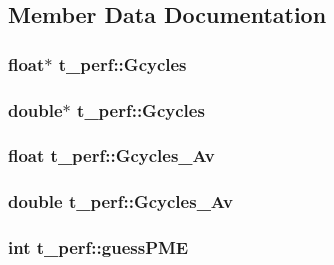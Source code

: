 \subsection{\-Member \-Data \-Documentation}
\hypertarget{structt__perf_a4fab4e6e488abcd62c5a43de2e0d6f57}{
\subsubsection[{\-Gcycles}]{\setlength{\rightskip}{0pt plus 5cm}float$\ast$ {\bf t\-\_\-perf\-::\-Gcycles}}}\label{structt__perf_a4fab4e6e488abcd62c5a43de2e0d6f57}
\hypertarget{structt__perf_a03f95af83a63ca4ca7eed041e36dce98}{
\subsubsection[{\-Gcycles}]{\setlength{\rightskip}{0pt plus 5cm}double$\ast$ {\bf t\-\_\-perf\-::\-Gcycles}}}\label{structt__perf_a03f95af83a63ca4ca7eed041e36dce98}
\hypertarget{structt__perf_a638c74dce848e84e8b504e0fbb7b301e}{
\subsubsection[{\-Gcycles\-\_\-\-Av}]{\setlength{\rightskip}{0pt plus 5cm}float {\bf t\-\_\-perf\-::\-Gcycles\-\_\-\-Av}}}\label{structt__perf_a638c74dce848e84e8b504e0fbb7b301e}
\hypertarget{structt__perf_a72470a46cefed6810e41b5ba939713cb}{
\subsubsection[{\-Gcycles\-\_\-\-Av}]{\setlength{\rightskip}{0pt plus 5cm}double {\bf t\-\_\-perf\-::\-Gcycles\-\_\-\-Av}}}\label{structt__perf_a72470a46cefed6810e41b5ba939713cb}
\hypertarget{structt__perf_aa02e58a4651a343254235561d51a5461}{
\subsubsection[{guess\-P\-M\-E}]{\setlength{\rightskip}{0pt plus 5cm}int {\bf t\-\_\-perf\-::guess\-P\-M\-E}}}\label{structt__perf_aa02e58a4651a343254235561d51a5461}

